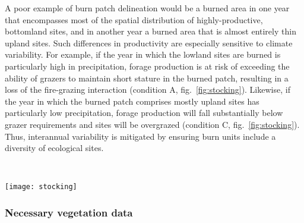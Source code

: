 A poor example of burn patch delineation would be a burned area in one year that encompasses most of the spatial distribution of highly-productive, bottomland sites, and in another year a burned area that is almost entirely thin upland sites. 
Such differences in productivity are especially sensitive to climate variability. 
For example, if the year in which the lowland sites are burned is particularly high in precipitation, forage production is at risk of exceeding the ability of grazers to maintain short stature in the burned patch, resulting in a loss of the fire-grazing interaction (condition A, fig.~\ref{fig:stocking}). 
Likewise, if the year in which the burned patch comprises mostly upland sites has particularly low precipitation, forage production will fall substantially below grazer requirements and sites will be overgrazed (condition C, fig.~\ref{fig:stocking}). 
Thus, interannual variability is mitigated by ensuring burn units include a diversity of ecological sites. 

\begin{figure*}[t]
	\begin{minipage}{0.55\textwidth}
		\raggedright
			\caption[Optimal stocking to couple fire and grazing]
		{Successfully coupling fire and grazing regimes requires a moderate stocking rate (B) that matches grazer offtake to vegetation production. 
			Under excessive stocking (C), the fire-grazing interaction is weakened as grazers are forced to forage beyond the perimeter of the burned patch. 
			The consequences of overstocking are intuitive: poor grazer performance and excessive severity to the plant community. 
			Less intuitive\textemdash especially in the context of conservation grazing\textemdash are the consequences of understocking (A). 
			If plant production exceeds the capacity of grazers to consume the available forage, vegetation will reach maturity and subsequent declines in forage quality risks weakening the magnet effect that concentrates grazers to burned patches. }
		\label{fig:stocking}
	\end{minipage}
~~
	\begin{minipage}{0.4\textwidth}
		\flushright
	\texttt{[image: stocking]}
	\end{minipage}
\end{figure*}

\subsubsection{Necessary vegetation data}

